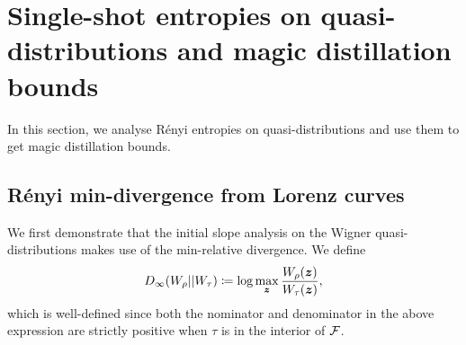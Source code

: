 \documentclass[pra,
aps,
twocolumn,
superscriptaddress,
groupedaddress,
nofootinbib,
reprint
]{revtex4-1}
\begin{document}
\section{Single-shot entropies on quasi-distributions and magic distillation bounds}\label{app:single-shot}

In this section, we analyse R\'{e}nyi entropies on quasi-distributions and use them to get magic distillation bounds.

\subsection{R\'{e}nyi min-divergence from Lorenz curves}
We first demonstrate that the initial slope analysis on the Wigner quasi-distributions makes use of the min-relative divergence. We define 
\begin{equation}
	D_\infty(W_\rho || W_\tau) \coloneqq \log  \max_{\bm{z}} \frac{W_\rho(\bm{z})}{W_\tau(\bm{z})},
\end{equation}
which is well-defined since both the nominator and denominator in the above expression are strictly positive when $\tau$ is in the interior of ${\mathcal F}$.
\end{document}

